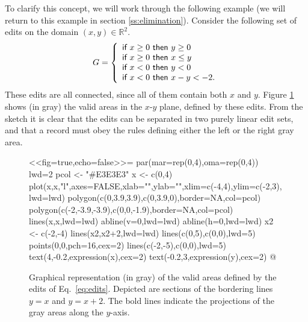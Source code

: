\documentclass[11pt,fleqn,a4paper]{article}
\begin{document}
To clarify this concept, we will work through the following example (we will
return to this example in section \ref{ss:elimination}). Consider the following
set of edits on the domain $(x,y)\in \mathbb{R}^2$.
%
\begin{equation}
G = \left\{\begin{array}{l}
\textrm{\sf if } x \geq 0 \textrm{ \sf then } y\geq 0\\
\textrm{\sf if } x \geq 0 \textrm{ \sf then } x \leq y\\
\textrm{\sf if } x < 0 \textrm{ \sf then } y < 0\\
\textrm{\sf if } x < 0 \textrm{ \sf then } x - y < -2. \\
\end{array}\right.
\label{eq:edits}
\end{equation}
These edits are all connected, since all of them contain both $x$ and $y$.
Figure \ref{figprojections} shows (in gray) the valid areas in the $x$-$y$ plane,
defined by these edits. From the sketch it is clear that the edits can be
separated in two purely linear edit sets, and that a record must obey the rules
defining either the left or the right gray area.
%
\begin{figure}
\centering
<<fig=true,echo=false>>=
    par(mar=rep(0,4),oma=rep(0,4))
    lwd=2
    pcol <- "#E3E3E3" 
    x <- c(0,4)
    plot(x,x,"l",axes=FALSE,xlab="",ylab="",xlim=c(-4,4),ylim=c(-2,3),lwd=lwd)
    polygon(c(0,3.9,3.9),c(0,3.9,0),border=NA,col=pcol)
    polygon(c(-2,-3.9,-3.9),c(0,0,-1.9),border=NA,col=pcol)
    lines(x,x,lwd=lwd)
    abline(v=0,lwd=lwd)
    abline(h=0,lwd=lwd)
    x2 <- c(-2,-4)
    lines(x2,x2+2,lwd=lwd)
    lines(c(0,5),c(0,0),lwd=5)
    points(0,0,pch=16,cex=2)
    lines(c(-2,-5),c(0,0),lwd=5)
    text(4,-0.2,expression(x),cex=2)
    text(-0.2,3,expression(y),cex=2)
@
\caption{Graphical representation (in gray) of the valid areas defined by the
edits of Eq.\ \eqref{eq:edits}. Depicted are sections of the bordering lines
$y=x$ and $y=x+2$.  The bold lines indicate the projections of the gray areas
along the $y$-axis.
}
\label{figprojections}
\end{figure}
\end{document}
